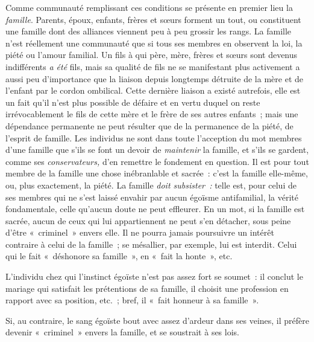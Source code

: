 \documentclass[french,twoside]{book} %
\begin{document}
Comme communauté remplissant ces conditions se présente en premier lieu la \emph{famille}. Parents, époux, enfants, frères et sœurs forment un tout, ou constituent une famille dont des alliances viennent peu à peu grossir les rangs. La famille n’est réellement une communauté que si tous ses membres en observent la loi, la piété ou l’amour familial. Un fils à qui père, mère, frères et sœurs sont devenus indifférents \emph{a été }fils, mais sa qualité de fils ne se manifestant plus activement a aussi peu d’importance que la liaison depuis longtemps détruite de la mère et de l’enfant par le cordon ombilical. Cette dernière liaison a existé autrefois, elle est un fait qu’il n’est plus possible de défaire et en vertu duquel on reste irrévocablement le fils de cette mère et le frère de ses autres enfants ; mais une dépendance permanente ne peut résulter que de la permanence de la piété, de l’esprit de famille. Les individus ne sont dans toute l’acception du mot membres d’une famille que s’ils se font un devoir de \emph{maintenir} la famille, et s’ils se gardent, comme ses \emph{conservateurs,} d’en remettre le fondement en question. Il est pour tout membre de la famille une chose inébranlable et sacrée : c’est la famille elle-même, ou, plus exactement, la piété. La famille \emph{doit subsister :} telle est, pour celui de ses membres qui ne s’est laissé envahir par aucun égoïsme antifamilial, la vérité fondamentale, celle qu’aucun doute ne peut effleurer. En un mot,  si la famille est sacrée, aucun de ceux qui lui appartiennent ne peut s’en détacher, sous peine d’être « criminel » envers elle. Il ne pourra jamais poursuivre un intérêt contraire à celui de la famille ; se mésallier, par exemple, lui est interdit. Celui qui le fait « déshonore sa famille », en « fait la honte », etc.\par
L’individu chez qui l’instinct égoïste n’est pas assez fort se soumet : il conclut le mariage qui satisfait les prétentions de sa famille, il choisit une profession en rapport avec sa position, etc. ; bref, il « fait honneur à sa famille ».\par
Si, au contraire, le sang égoïste bout avec assez d’ardeur dans ses veines, il préfère devenir « criminel » envers la famille, et se soustrait à ses lois.\par
\end{document}
